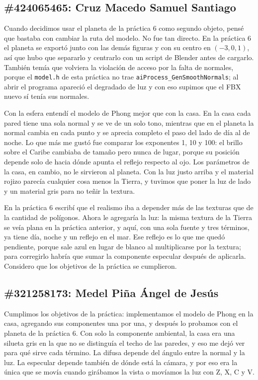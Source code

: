 \subsection*{\#424065465: Cruz Macedo Samuel Santiago}
Cuando decidimos usar el planeta de la práctica 6 como segundo objeto, pensé que bastaba con cambiar la ruta del modelo. No fue tan directo. En la práctica 6 el planeta se exportó junto con las demás figuras y con su centro en $(-3, 0, 1)$, así que hubo que separarlo y centrarlo con un script de Blender antes de cargarlo. También temía que volviera la violación de acceso por la falta de normales, porque el \texttt{model.h} de esta práctica no trae \texttt{aiProcess\_GenSmoothNormals}; al abrir el programa apareció el degradado de luz y con eso supimos que el FBX nuevo sí tenía sus normales.

Con la esfera entendí el modelo de Phong mejor que con la casa. En la casa cada pared tiene una sola normal y se ve de un solo tono, mientras que en el planeta la normal cambia en cada punto y se aprecia completo el paso del lado de día al de noche. Lo que más me gustó fue comparar los exponentes 1, 10 y 100: el brillo sobre el Caribe cambiaba de tamaño pero nunca de lugar, porque su posición depende solo de hacia dónde apunta el reflejo respecto al ojo. Los parámetros de la casa, en cambio, no le sirvieron al planeta. Con la luz justo arriba y el material rojizo parecía cualquier cosa menos la Tierra, y tuvimos que poner la luz de lado y un material gris para no teñir la textura.

En la práctica 6 escribí que el realismo iba a depender más de las texturas que de la cantidad de polígonos. Ahora le agregaría la luz: la misma textura de la Tierra se veía plana en la práctica anterior, y aquí, con una sola fuente y tres términos, ya tiene día, noche y un reflejo en el mar. Ese reflejo es lo que me quedó pendiente, porque sale azul en lugar de blanco al multiplicarse por la textura; para corregirlo habría que sumar la componente especular después de aplicarla. Considero que los objetivos de la práctica se cumplieron.

\subsection*{\#321258173: Medel Piña Ángel de Jesús}
Cumplimos los objetivos de la práctica: implementamos el modelo de Phong en la casa, agregando sus componentes una por una, y después lo probamos con el planeta de la práctica 6. Con solo la componente ambiental, la casa era una silueta gris en la que no se distinguía el techo de las paredes, y eso me dejó ver para qué sirve cada término. La difusa depende del ángulo entre la normal y la luz. La especular depende también de dónde está la cámara, y por eso era la única que se movía cuando girábamos la vista o movíamos la luz con Z, X, C y V.

